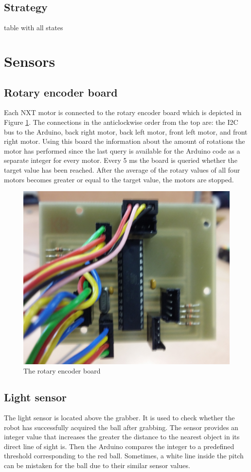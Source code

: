 \documentclass[a4paper,12pt]{article}
\begin{document}
\subsection{Strategy}

table with all states

\section{Sensors}
\subsection{Rotary encoder board}

Each NXT motor is connected to the rotary encoder board which is depicted in Figure \ref{fig:rotary}. The connections in the anticlockwise order from the top are: the I2C bus to the Arduino, back right motor, back left motor, front left motor, and front right motor. Using this board the information about the amount of rotations the motor has performed since the last query is available for the Arduino code as a separate integer for every motor. Every 5 ms the board is queried whether the target value has been reached. After the average of the rotary values of all four motors becomes greater or equal to the target value, the motors are stopped.

\begin{figure}[ht!]
\centering
\includegraphics[scale=.1]{rotary1}
\caption{The rotary encoder board}
\label{fig:rotary}
\end{figure}

\subsection{Light sensor}

The light sensor is located above the grabber. It is used to check whether
the robot has successfully acquired the ball after grabbing. The sensor
provides an integer value that increases the greater the distance to the
nearest object in its direct line of sight is. Then the Arduino compares the integer
to a predefined threshold corresponding to the red ball. Sometimes, a white
line inside the pitch can be mistaken for the ball due to their similar sensor
values.
\end{document}

